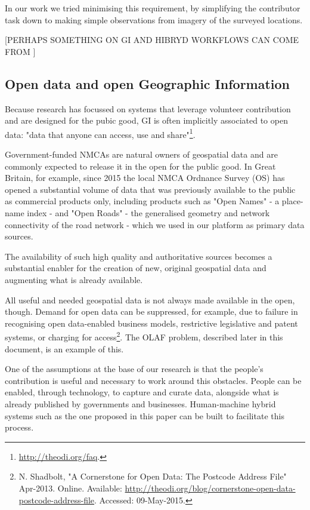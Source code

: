 In our work we tried minimising this requirement, by simplifying the contributor task down to making simple observations from imagery of the surveyed locations.

[PERHAPS SOMETHING ON GI AND HIBRYD WORKFLOWS CAN COME FROM \cite{Rice:2012vy} ]

\subsection{Open data and open Geographic Information}
\label{open-data-and-gi}

Because research has focussed on systems that leverage volunteer contribution and are designed for the pubic good, GI is often implicitly associated to open data: "data that anyone can access, use and share"\footnote{\url{http://theodi.org/faq}.}. 

Government-funded NMCAs are natural owners of geospatial data and are commonly expected to release it in the open for the public good. In Great Britain, for example, since 2015 the local NMCA Ordnance Survey (OS) has opened a substantial volume of data that was previously available to the public as commercial products only, including products such as "Open Names" - a place-name index - and "Open Roads" - the generalised geometry and network connectivity of the road network - which we used in our platform as primary data sources.
	
The availability of such high quality and authoritative sources becomes a substantial enabler for the creation of new, original geospatial data and augmenting what is already available.

All useful and needed geospatial data is not always made available in the open, though. Demand for open data can be suppressed, for example, due to failure in recognising open data-enabled business models, restrictive legislative and patent systems, or charging for access\footnote{N. Shadbolt, "A Cornerstone for Open Data: The Postcode Address File" Apr-2013. Online. Available: \url{http://theodi.org/blog/cornerstone-open-data-postcode-address-file}. Accessed: 09-May-2015.}. The OLAF problem, described later in this document, is an example of this.
	
One of the assumptions at the base of our research is that the people's contribution is useful and necessary to work around this obstacles. People can be enabled, through technology, to capture and curate data, alongside what is already published by governments and businesses. Human-machine hybrid systems such as the one proposed in this paper can be built to facilitate this process.

